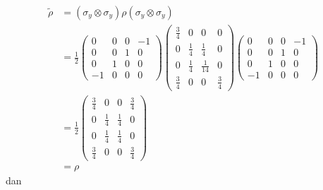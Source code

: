 \begin{equation}
	\begin{aligned}
		\tilde{\rho} 
		&= (\sigma_y \otimes \sigma_y) \rho (\sigma_y \otimes \sigma_y)\\
		&= \frac{1}{2}
		\begin{pmatrix}
			0 & 0 & 0 & -1 \\
			0 & 0 & 1 & 0 \\
			0 & 1 & 0 & 0 \\
			-1 & 0 & 0 & 0
		\end{pmatrix}
		\begin{pmatrix}
			\frac{3}{4} & 0 & 0 & 0 \\
			0 & \frac{1}{4} & \frac{1}{4} & 0 \\
			0 & \frac{1}{4} & \frac{1}{14} & 0 \\
			\frac{3}{4} & 0 & 0 & \frac{3}{4}
		\end{pmatrix}
		\begin{pmatrix}
			0 & 0 & 0 & -1 \\
			0 & 0 & 1 & 0 \\
			0 & 1 & 0 & 0 \\
			-1 & 0 & 0 & 0
		\end{pmatrix}\\
		&= \frac{1}{2}
		\begin{pmatrix}
			\frac{3}{4}&0&0&\frac{3}{4}\\
			0&\frac{1}{4}&\frac{1}{4}&0\\
			0&\frac{1}{4}&\frac{1}{4}&0\\
			\frac{3}{4}&0&0&\frac{3}{4}
		\end{pmatrix}\\
		&=\rho
	\end{aligned}
\end{equation}
dan

